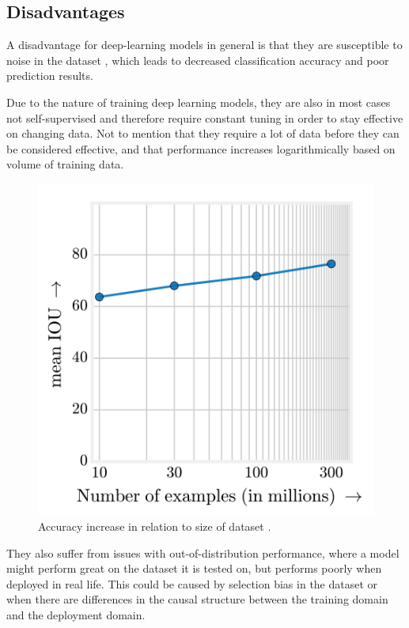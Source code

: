 \subsection{Disadvantages}
A disadvantage for deep-learning models in general is that they are susceptible to noise in the dataset \cite{noise1,noise2}, which leads to decreased classification accuracy and poor prediction results.
\par
Due to the nature of training deep learning models, they are also in most cases not self-supervised and therefore require constant tuning in order to stay effective on changing data. Not to mention that they require a lot of data before they can be considered effective, and that performance increases logarithmically based on volume of training data\cite{deeplearning_dataset}.
\begin{figure}[H]
    \centering
    \includegraphics[width=0.5\linewidth]{resources/related_works/deeplearning_datasize.png}
    \caption{Accuracy increase in relation to size of dataset \cite{deeplearning_dataset}.}
\end{figure}
They also suffer from issues with out-of-distribution performance, where a model might perform great on the dataset it is tested on, but performs poorly when deployed in real life. This could be caused by selection bias in the dataset or when there are differences in the causal structure between the training domain and the deployment domain\cite{deeplearning_ood}.
